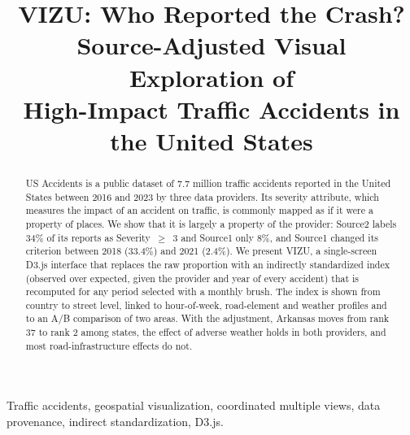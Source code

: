 \documentclass[conference]{IEEEtran}
\begin{document}
\title{VIZU: Who Reported the Crash?\\Source-Adjusted Visual Exploration of\\High-Impact Traffic Accidents in the United States}

\author{
}

\maketitle

\begin{abstract}
US Accidents is a public dataset of 7.7 million traffic accidents reported in the United States between 2016 and 2023 by three data providers. Its severity attribute, which measures the impact of an accident on traffic, is commonly mapped as if it were a property of places. We show that it is largely a property of the provider: Source2 labels 34\% of its reports as Severity~$\geq$~3 and Source1 only 8\%, and Source1 changed its criterion between 2018 (33.4\%) and 2021 (2.4\%). We present VIZU, a single-screen D3.js interface that replaces the raw proportion with an indirectly standardized index (observed over expected, given the provider and year of every accident) that is recomputed for any period selected with a monthly brush. The index is shown from country to street level, linked to hour-of-week, road-element and weather profiles and to an A/B comparison of two areas. With the adjustment, Arkansas moves from rank 37 to rank 2 among states, the effect of adverse weather holds in both providers, and most road-infrastructure effects do not.
\end{abstract}

\begin{IEEEkeywords}
Traffic accidents, geospatial visualization, coordinated multiple views, data provenance, indirect standardization, D3.js.
\end{IEEEkeywords}

\end{document}
